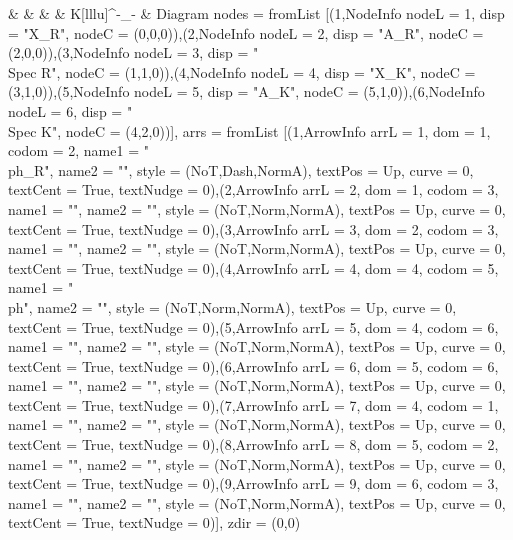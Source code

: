 { &  &  &  & \Spec K\ar@{->}[lllu]^-{}_-{} & }Diagram {nodes = fromList [(1,NodeInfo {nodeL = 1, disp = "X_R", nodeC = (0,0,0)}),(2,NodeInfo {nodeL = 2, disp = "A_R", nodeC = (2,0,0)}),(3,NodeInfo {nodeL = 3, disp = "\\Spec R", nodeC = (1,1,0)}),(4,NodeInfo {nodeL = 4, disp = "X_K", nodeC = (3,1,0)}),(5,NodeInfo {nodeL = 5, disp = "A_K", nodeC = (5,1,0)}),(6,NodeInfo {nodeL = 6, disp = "\\Spec K", nodeC = (4,2,0)})], arrs = fromList [(1,ArrowInfo {arrL = 1, dom = 1, codom = 2, name1 = "\\ph_R", name2 = "", style = (NoT,Dash,NormA), textPos = Up, curve = 0, textCent = True, textNudge = 0}),(2,ArrowInfo {arrL = 2, dom = 1, codom = 3, name1 = "", name2 = "", style = (NoT,Norm,NormA), textPos = Up, curve = 0, textCent = True, textNudge = 0}),(3,ArrowInfo {arrL = 3, dom = 2, codom = 3, name1 = "", name2 = "", style = (NoT,Norm,NormA), textPos = Up, curve = 0, textCent = True, textNudge = 0}),(4,ArrowInfo {arrL = 4, dom = 4, codom = 5, name1 = "\\ph", name2 = "", style = (NoT,Norm,NormA), textPos = Up, curve = 0, textCent = True, textNudge = 0}),(5,ArrowInfo {arrL = 5, dom = 4, codom = 6, name1 = "", name2 = "", style = (NoT,Norm,NormA), textPos = Up, curve = 0, textCent = True, textNudge = 0}),(6,ArrowInfo {arrL = 6, dom = 5, codom = 6, name1 = "", name2 = "", style = (NoT,Norm,NormA), textPos = Up, curve = 0, textCent = True, textNudge = 0}),(7,ArrowInfo {arrL = 7, dom = 4, codom = 1, name1 = "", name2 = "", style = (NoT,Norm,NormA), textPos = Up, curve = 0, textCent = True, textNudge = 0}),(8,ArrowInfo {arrL = 8, dom = 5, codom = 2, name1 = "", name2 = "", style = (NoT,Norm,NormA), textPos = Up, curve = 0, textCent = True, textNudge = 0}),(9,ArrowInfo {arrL = 9, dom = 6, codom = 3, name1 = "", name2 = "", style = (NoT,Norm,NormA), textPos = Up, curve = 0, textCent = True, textNudge = 0})], zdir = (0,0)}

